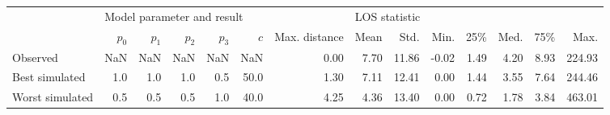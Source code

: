 \begin{tabular}{lrrrrrrrrrrrrr}
\toprule
{} & \multicolumn{6}{l}{Model parameter and result} & \multicolumn{7}{l}{LOS statistic} \\
{} &                    \(p_0\) & \(p_1\) & \(p_2\) & \(p_3\) & \(c\) & Max. distance &          Mean &   Std. &  Min. &   25\% &  Med. &   75\% &    Max. \\
\midrule
Observed        &                        NaN &     NaN &     NaN &     NaN &   NaN &          0.00 &          7.70 &  11.86 & -0.02 &  1.49 &  4.20 &  8.93 &  224.93 \\
Best simulated  &                        1.0 &     1.0 &     1.0 &     0.5 &  50.0 &          1.30 &          7.11 &  12.41 &  0.00 &  1.44 &  3.55 &  7.64 &  244.46 \\
Worst simulated &                        0.5 &     0.5 &     0.5 &     1.0 &  40.0 &          4.25 &          4.36 &  13.40 &  0.00 &  0.72 &  1.78 &  3.84 &  463.01 \\
\bottomrule
\end{tabular}
